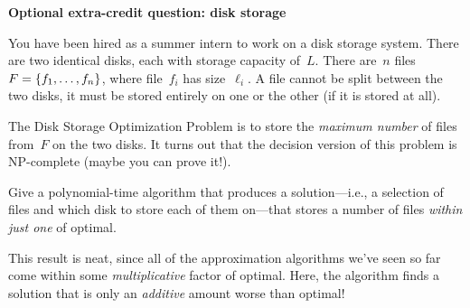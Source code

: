\documentclass[11pt,addpoints]{exam}
\begin{document}
\begin{questions}

  \bonusquestion[5] \textbf{Optional extra-credit question: disk storage}

  You have been hired as a summer intern to work on a disk storage system.
  There are two identical disks, each with storage capacity of~$L$.
  There are~$n$ files $F = \{f_1, \dots, f_n \}$, where file~$f_i$ has size~$\ell_{i}$.
  A file cannot be split between the two disks, it must be stored entirely on one or the other (if it is stored at all).

  The Disk Storage Optimization Problem is to store the \emph{maximum number} of files from~$F$ on the two disks.
  It turns out that the decision version of this problem is NP-complete (maybe you can prove it!).

  Give a polynomial-time algorithm that produces a solution---i.e., a selection of files and which disk to store each of them on---that stores a number of files \emph{within just one} of optimal.

  This result is neat, since all of the approximation algorithms we've seen so far come within some \emph{multiplicative} factor of optimal.
  Here, the algorithm finds a solution that is only an \emph{additive} amount worse than optimal!

  \begin{solution}

  \end{solution}
  
\end{questions}
\end{document}
